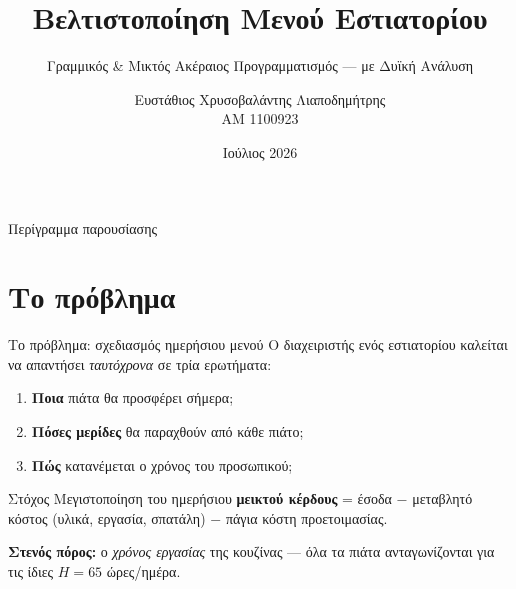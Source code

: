 \documentclass[aspectratio=169,11pt]{beamer}
\title[Βελτιστοποίηση Μενού]{Βελτιστοποίηση Μενού Εστιατορίου}
\subtitle{Γραμμικός \& Μικτός Ακέραιος Προγραμματισμός --- με Δυϊκή Ανάλυση}
\author[Ε.Χ. Λιαποδημήτρης]{Ευστάθιος Χρυσοβαλάντης Λιαποδημήτρης \\ \small ΑΜ 1100923}
\institute[]{Γραμμική \& Συνδυαστική Βελτιστοποίηση}
\date{Ιούλιος 2026}
\begin{document}
\begin{frame}[plain]
  \titlepage
\end{frame}

\begin{frame}{Περίγραμμα παρουσίασης}
  \tableofcontents
\end{frame}

\section{Το πρόβλημα}
\begin{frame}{Το πρόβλημα: σχεδιασμός ημερήσιου μενού}
  Ο διαχειριστής ενός εστιατορίου καλείται να απαντήσει \emph{ταυτόχρονα} σε τρία
  ερωτήματα:
  \begin{enumerate}
    \item \textbf{Ποια} πιάτα θα προσφέρει σήμερα;
    \item \textbf{Πόσες μερίδες} θα παραχθούν από κάθε πιάτο;
    \item \textbf{Πώς} κατανέμεται ο χρόνος του προσωπικού;
  \end{enumerate}
  \vfill
  \begin{block}{Στόχος}
    Μεγιστοποίηση του ημερήσιου \textbf{μεικτού κέρδους} = έσοδα $-$ μεταβλητό
    κόστος (υλικά, εργασία, σπατάλη) $-$ πάγια κόστη προετοιμασίας.
  \end{block}
  \vfill
  \footnotesize \textbf{Στενός πόρος:} ο \emph{χρόνος εργασίας} της κουζίνας ---
  όλα τα πιάτα ανταγωνίζονται για τις ίδιες $H=65$ ώρες/ημέρα.
\end{frame}
\end{document}
